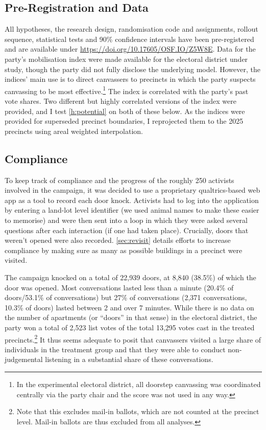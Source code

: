 \documentclass[11pt,a4paper]{scrartcl}
\begin{document}
\subsection{Pre-Registration and Data}

All hypotheses, the research design, randomisation code and assignments, rollout sequence, statistical tests and 90\% confidence intervals have been pre-registered and are available under \href{https://doi.org/10.17605/OSF.IO/Z5W8E}{https://doi.org/10.17605/OSF.IO/Z5W8E}. Data for the party's mobilisation index were made available for the electoral district under study, though the party did not fully disclose the underlying model. However, the indices' main use is to direct canvassers to precincts in which the party suspects canvassing to be most effective.\footnote{In the experimental electoral district, all doorstep canvassing was coordinated centrally via the party chair and the score was not used in any way.} The index is correlated with the party's past vote shares. Two different but highly correlated versions of the index were provided, and I test \autoref{h:potential} on both of these below. As the indices were provided for superseded precinct boundaries, I reprojected them to the 2025 precincts using areal weighted interpolation.

\subsection{Compliance}

To keep track of compliance and the progress of the roughly 250 activists involved in the campaign, it was decided to use a proprietary qualtrics-based web app as a tool to record each door knock.  Activists had to log into the application by entering a land-lot level identifier (we used animal names to make these easier to memorise) and were then sent into a loop in which they were asked  several questions after each interaction (if one had taken place). Crucially, doors that weren't opened were also recorded. \autoref{sec:revisit} details efforts to increase compliance by making sure as many as possible buildings in a precinct were visited.




The campaign knocked on a total of 22,939 doors, at 8,840 (38.5\%) of which the door was opened. Most conversations lasted less than a minute (20.4\% of doors/53.1\% of conversations) but 27\% of conversations (2,371 conversations, 10.3\% of doors) lasted between 2 and over 7 minutes. While there is no data on the number of apartments (or \enquote{doors} in that sense) in the electoral district, the party won a total of 2,523 list votes of the total 13,295 votes cast  in the treated precincts.\footnote{Note that this excludes mail-in ballots, which are not counted at the precinct level. Mail-in ballots are thus excluded from all analyses.} It thus seems adequate to posit that canvassers visited a large share of individuals in the treatment group and that they were able to conduct non-judgemental listening in a substantial share of these conversations.
\end{document}
